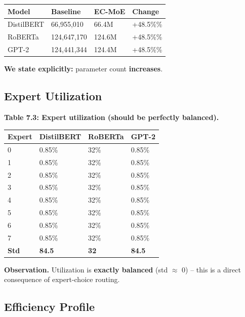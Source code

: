 \begin{table}[H]
\centering
\small
\begin{tabular}{llll}
\toprule
\textbf{Model} & \textbf{Baseline} & \textbf{EC-MoE} & \textbf{Change} \\
\midrule
DistilBERT & 66,955,010 & 66.4M & +48.5\%\% \\
RoBERTa & 124,647,170 & 124.6M & +48.5\%\% \\
GPT-2 & 124,441,344 & 124.4M & +48.5\%\% \\
\bottomrule
\end{tabular}
\end{table}

\textbf{We state explicitly:} parameter count \textbf{increases}.

\subsection{Expert Utilization}

\textbf{Table 7.3: Expert utilization (should be perfectly balanced).}

\begin{table}[H]
\centering
\small
\begin{tabular}{llll}
\toprule
\textbf{Expert} & \textbf{DistilBERT} & \textbf{RoBERTa} & \textbf{GPT-2} \\
\midrule
0 & 0.85\% & 32\% & 0.85\% \\
1 & 0.85\% & 32\% & 0.85\% \\
2 & 0.85\% & 32\% & 0.85\% \\
3 & 0.85\% & 32\% & 0.85\% \\
4 & 0.85\% & 32\% & 0.85\% \\
5 & 0.85\% & 32\% & 0.85\% \\
6 & 0.85\% & 32\% & 0.85\% \\
7 & 0.85\% & 32\% & 0.85\% \\
\textbf{Std} & \textbf{84.5} & \textbf{32} & \textbf{84.5} \\
\bottomrule
\end{tabular}
\end{table}

\textbf{Observation.} Utilization is \textbf{exactly balanced} (std $\approx$ 0) -- this is a 
direct consequence of expert-choice routing.

\subsection{Efficiency Profile}

